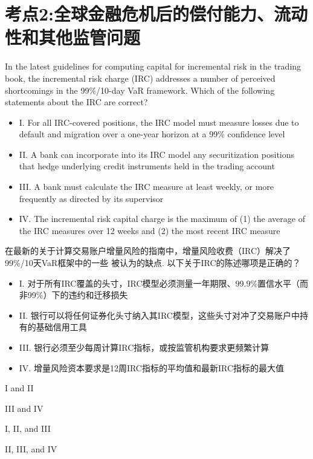 \documentclass{article}
\newcounter{question} %
\begin{document}
\section{考点2:全球金融危机后的偿付能力、流动性和其他监管问题}
\setcounter{question}{0}
\begin{question}
    In the latest guidelines for computing capital for incremental risk in the trading book, the incremental risk charge (IRC) addresses a number of perceived shortcomings in the 99\%/10-day VaR framework. Which of the following statements about the IRC are correct?
    \begin{itemize}
    \item I. For all IRC-covered positions, the IRC model must measure losses due to default and migration over a one-year horizon at a 99\% confidence level
    \item II. A bank can incorporate into its IRC model any securitization positions that hedge underlying credit instruments held in the trading account
    \item III. A bank must calculate the IRC measure at least weekly, or more frequently as directed by its supervisor
    \item IV. The incremental risk capital charge is the maximum of (1) the average of the IRC measures over 12 weeks and (2) the most recent IRC measure
    \end{itemize}
    在最新的关于计算交易账户增量风险的指南中，增量风险收费（IRC）解决了99\%/10天VaR框架中的一些 被认为的缺点. 以下关于IRC的陈述哪项是正确的？
    \begin{itemize}
    \item I. 对于所有IRC覆盖的头寸，IRC模型必须测量一年期限、99.9\%置信水平（而非99\%）下的违约和迁移损失
    \item II. 银行可以将任何证券化头寸纳入其IRC模型，这些头寸对冲了交易账户中持有的基础信用工具
    \item III. 银行必须至少每周计算IRC指标，或按监管机构要求更频繁计算
    \item IV. 增量风险资本要求是12周IRC指标的平均值和最新IRC指标的最大值
    \end{itemize}
\end{question}

\begin{choices}
    \item I and II
    \item III and IV
    \item I, II, and III
    \item II, III, and IV
\end{choices}
\end{document}
